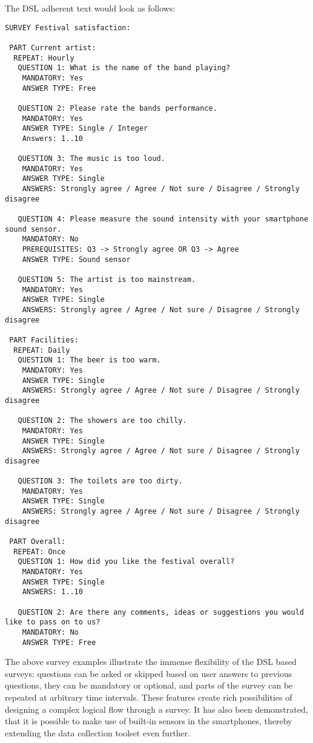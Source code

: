 The DSL adherent text would look as follows:
\begin{verbatim}
SURVEY Festival satisfaction:

 PART Current artist:
  REPEAT: Hourly
   QUESTION 1: What is the name of the band playing?
    MANDATORY: Yes
    ANSWER TYPE: Free
      
   QUESTION 2: Please rate the bands performance.
    MANDATORY: Yes
    ANSWER TYPE: Single / Integer
    Answers: 1..10

   QUESTION 3: The music is too loud.
    MANDATORY: Yes
    ANSWER TYPE: Single
    ANSWERS: Strongly agree / Agree / Not sure / Disagree / Strongly disagree
    
   QUESTION 4: Please measure the sound intensity with your smartphone sound sensor.
    MANDATORY: No
    PREREQUISITES: Q3 -> Strongly agree OR Q3 -> Agree
    ANSWER TYPE: Sound sensor
    
   QUESTION 5: The artist is too mainstream.
    MANDATORY: Yes
    ANSWER TYPE: Single
    ANSWERS: Strongly agree / Agree / Not sure / Disagree / Strongly disagree
    
 PART Facilities:
  REPEAT: Daily
   QUESTION 1: The beer is too warm.
    MANDATORY: Yes
    ANSWER TYPE: Single
    ANSWERS: Strongly agree / Agree / Not sure / Disagree / Strongly disagree
    
   QUESTION 2: The showers are too chilly.
    MANDATORY: Yes
    ANSWER TYPE: Single
    ANSWERS: Strongly agree / Agree / Not sure / Disagree / Strongly disagree
    
   QUESTION 3: The toilets are too dirty.
    MANDATORY: Yes
    ANSWER TYPE: Single
    ANSWERS: Strongly agree / Agree / Not sure / Disagree / Strongly disagree
    
 PART Overall:
  REPEAT: Once
   QUESTION 1: How did you like the festival overall?
    MANDATORY: Yes
    ANSWER TYPE: Single
    ANSWERS: 1..10
    
   QUESTION 2: Are there any comments, ideas or suggestions you would like to pass on to us?
    MANDATORY: No
    ANSWER TYPE: Free
\end{verbatim}

The above survey examples illustrate the immense flexibility of the DSL based surveys: questions can be asked or skipped based on user answers to previous questions, they can be mandatory or optional, and parts of the survey can be repeated at arbitrary time intervals. These features create rich possibilities of designing a complex logical flow through a survey. It has also been demonstrated, that it is possible to make use of built-in sensors in the smartphones, thereby extending the data collection toolset even further.